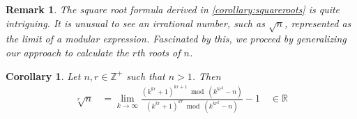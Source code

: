 \documentclass[11pt,reqno]{article}
\theoremstyle{plain}
\newtheorem{corollary}[theorem]{Corollary}
\newtheorem{remark}{Remark}
\theoremstyle{definition}
\begin{document}
\begin{remark}
The square root formula derived in \cref{corollary:squareroots} is quite intriguing. It is unusual to see an irrational number, such as $\sqrt{n}$, represented as the limit of a modular expression. Fascinated by this, we proceed by generalizing our approach to calculate the $r$th roots of $n$.   
\end{remark}

\begin{corollary} \label{corollary:roots}
Let $n,r \in \mathbb{Z}^+$ such that $n > 1$. Then
\begin{align*}
\sqrt[r]{n} &= \lim_{k\rightarrow\infty}
    \frac{(k^{kr} + 1)^{kr+1} \bmod{(k^{kr^2}-n)}}
    {(k^{kr} + 1)^{kr} \bmod{ (k^{kr^2}-n)}} - 1  \quad \in \mathbb{R}
\end{align*}
\end{corollary}
\end{document}
